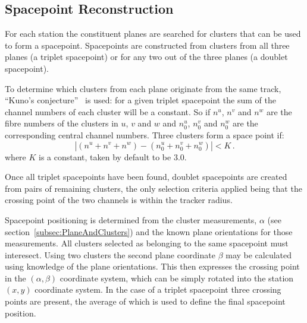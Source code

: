   \subsection{Spacepoint Reconstruction}
  \label{subsec:SpacepointReconstruction}
  For each station the constituent planes are searched for clusters that can be used to form a spacepoint. Spacepoints are constructed from clusters from all three planes (a triplet spacepoint) or for any two out of the three planes (a doublet spacepoint).

  To determine which clusters from each plane originate from the same track, ``Kuno's conjecture''~\cite{MiceTrackers} is used: for a given triplet spacepoint the sum of the channel numbers of each cluster will be a constant.  So if $n^u$, $n^v$ and $n^w$ are the fibre numbers of the clusters in $u$, $v$ and $w$ and $n^u_0$, $n^v_0$ and $n^w_0$ are the corresponding central channel numbers. Three clusters form a space point if:
  \begin{equation}
    | (n^u + n^v + n^w) - (n^u_0 + n^v_0 + n^w_0) | < K \, .
  \end{equation}
  where $K$ is a constant, taken by default to be 3.0.
  
  Once all triplet spacepoints have been found, doublet spacepoints are created from pairs of remaining clusters, the only selection criteria applied being that the crossing point of the two channels is within the tracker radius. 
  
  Spacepoint positioning is determined from the cluster measurements, $\alpha$ (see section~\ref{subsec:PlaneAndClusters}) and the known plane orientations for those measurements. All clusters selected as belonging to the same spacepoint must interesect. Using two clusters the second plane coordinate $\beta$ may be calculated using knowledge of the plane orientations. This then expresses the crossing point in the $(\alpha, \beta)$ coordinate system, which can be simply rotated into the station $(x, y)$ coordinate system. In the case of a triplet spacepoint three crossing points are present, the average of which is used to define the final spacepoint position.

%   

